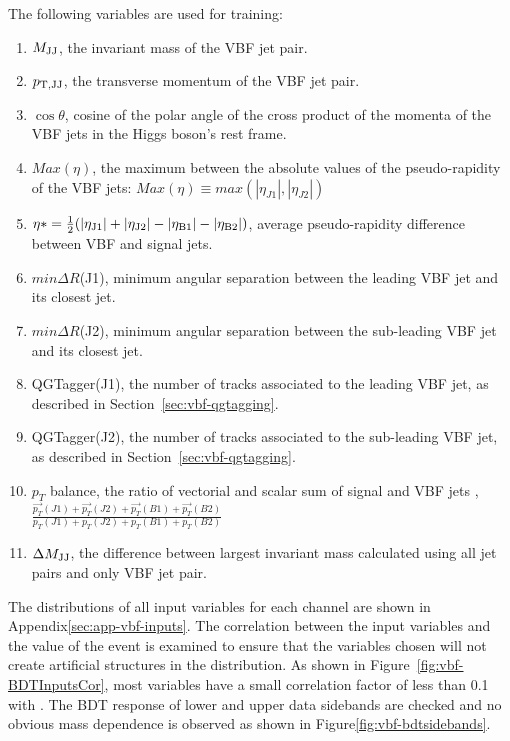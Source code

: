 The following variables are used for training:
\begin{enumerate}
\item $M_{\rm JJ}$, the invariant mass of the VBF jet pair. 
\item $p_{\rm T,JJ}$, the transverse momentum of the VBF jet pair. 
\item $\cos{\theta}$, cosine of the polar angle of the cross product of the momenta of the VBF jets in the Higgs boson's rest frame.
\item $Max (\eta)$, the maximum between the absolute values of the pseudo-rapidity of the VBF jets: $Max (\eta) \equiv max( |\eta_{J1}|, |\eta_{J2}| )$
\item $\eta* = \frac{1}{2}( |\eta_{\rm J1}| + |\eta_{\rm J2}| - |\eta_{\rm B1}| - |\eta_{\rm B2}|)$, average pseudo-rapidity difference between VBF and signal jets.
\item $min\Delta R$(J1), minimum angular separation between the leading VBF jet and its closest jet. 
\item $min\Delta R$(J2), minimum angular separation between the sub-leading VBF jet and its closest jet. 
\item QGTagger(J1),  the number of tracks associated to the leading VBF jet, as described in Section~\ref{sec:vbf-qgtagging}.
\item QGTagger(J2),  the number of tracks associated to the sub-leading VBF jet, as described in Section~\ref{sec:vbf-qgtagging}.
\item $p_{T}$ balance, the ratio of vectorial and scalar sum of signal and VBF jets \pT,  $\frac{\overrightarrow{p_{T}}(J1)+\overrightarrow{p_{T}}(J2)+\overrightarrow{p_{T}}(B1)+\overrightarrow{p_{T}}(B2) }{ p_{T}(J1)+p_{T}(J2)+p_{T}(B1)+p_{T}(B2)}$
\item $\Delta M_{\rm JJ}$, the difference between largest invariant mass calculated using all jet pairs and only VBF jet pair. 
\end{enumerate}

The distributions of all input variables for each channel are
shown in Appendix\ref{sec:app-vbf-inputs}.
The correlation between the input variables and the \Mbb value of the event
is examined to ensure that the variables chosen will not create artificial
structures in the \Mbb distribution.
As shown in Figure~\ref{fig:vbf-BDTInputsCor}, most variables have a
small correlation factor of less than 0.1 with \Mbb. 
The BDT response of lower and upper data sidebands are checked and no obvious
mass dependence is observed as shown in Figure\ref{fig:vbf-bdtsidebands}.

